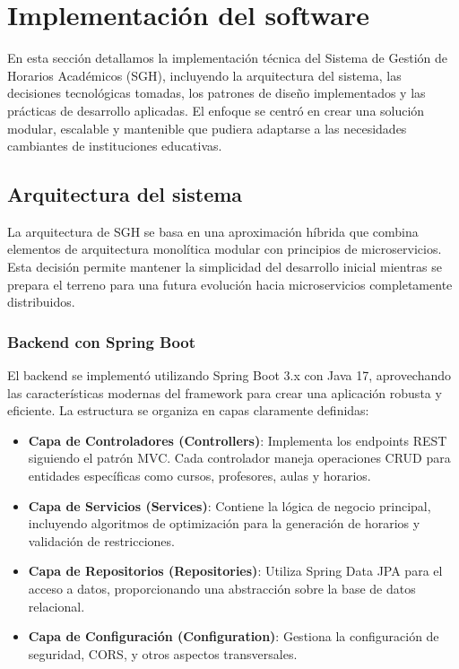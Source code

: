 \section{Implementación del software}

En esta sección detallamos la implementación técnica del Sistema de Gestión de Horarios Académicos (SGH), incluyendo la arquitectura del sistema, las decisiones tecnológicas tomadas, los patrones de diseño implementados y las prácticas de desarrollo aplicadas. El enfoque se centró en crear una solución modular, escalable y mantenible que pudiera adaptarse a las necesidades cambiantes de instituciones educativas.

\subsection{Arquitectura del sistema}

La arquitectura de SGH se basa en una aproximación híbrida que combina elementos de arquitectura monolítica modular con principios de microservicios. Esta decisión permite mantener la simplicidad del desarrollo inicial mientras se prepara el terreno para una futura evolución hacia microservicios completamente distribuidos.

\subsubsection{Backend con Spring Boot}

El backend se implementó utilizando Spring Boot 3.x con Java 17, aprovechando las características modernas del framework para crear una aplicación robusta y eficiente. La estructura se organiza en capas claramente definidas:

\begin{itemize}
\item \textbf{Capa de Controladores (Controllers)}: Implementa los endpoints REST siguiendo el patrón MVC. Cada controlador maneja operaciones CRUD para entidades específicas como cursos, profesores, aulas y horarios.
\item \textbf{Capa de Servicios (Services)}: Contiene la lógica de negocio principal, incluyendo algoritmos de optimización para la generación de horarios y validación de restricciones.
\item \textbf{Capa de Repositorios (Repositories)}: Utiliza Spring Data JPA para el acceso a datos, proporcionando una abstracción sobre la base de datos relacional.
\item \textbf{Capa de Configuración (Configuration)}: Gestiona la configuración de seguridad, CORS, y otros aspectos transversales.
\end{itemize}

